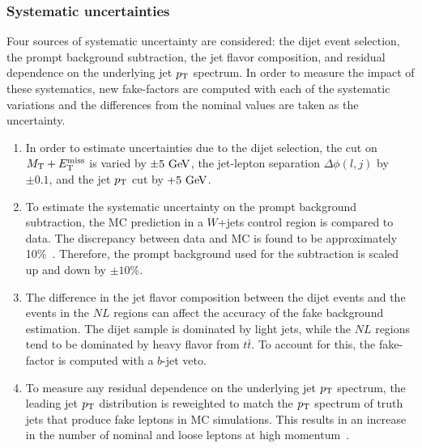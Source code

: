 \subsubsection{Systematic uncertainties}\label{ssww13tev:ff_systematics}
Four sources of systematic uncertainty are considered: the dijet event selection, the prompt background subtraction, the jet flavor composition, and residual dependence on the underlying jet $p_{\mathrm{T}}$ spectrum.
In order to measure the impact of these systematics, new fake-factors are computed with each of the systematic variations and the differences from the nominal values are taken as the uncertainty.
\begin{enumerate}
\item In order to estimate uncertainties due to the dijet selection, the cut on $M_{\textrm{T}}+E_{\mathrm{T}}^{\mathrm{miss}}$ is varied by $\pm5\gev$, the jet-lepton separation $\Delta\phi(l,j)$ by $\pm 0.1$, and the jet $p_{\mathrm{T}}$ cut by $+5\gev$.
\item To estimate the systematic uncertainty on the prompt background subtraction, the MC prediction in a $W$+jets control region is compared to data.  The discrepancy between data and MC is found to be approximately 10\%~\cite{2018.ssww-13tev-atlas-support}.  Therefore, the prompt background used for the subtraction is scaled up and down by $\pm 10\%$.
\item The difference in the jet flavor composition between the dijet events and the events in the $NL$ regions can affect the accuracy of the fake background estimation.  The dijet sample is dominated by light jets, while the $NL$ regions tend to be dominated by heavy flavor from $t\bar{t}$.  To account for this, the fake-factor is computed with a $b$-jet veto.
\item To measure any residual dependence on the underlying jet $p_{\mathrm{T}}$ spectrum, the leading jet $p_{\mathrm{T}}$ distribution is reweighted to match the $p_{\mathrm{T}}$ spectrum of truth jets that produce fake leptons in MC simulations.  This results in an increase in the number of nominal and loose leptons at high momentum~\cite{2018.ssww-13tev-atlas-support}.
\end{enumerate}

